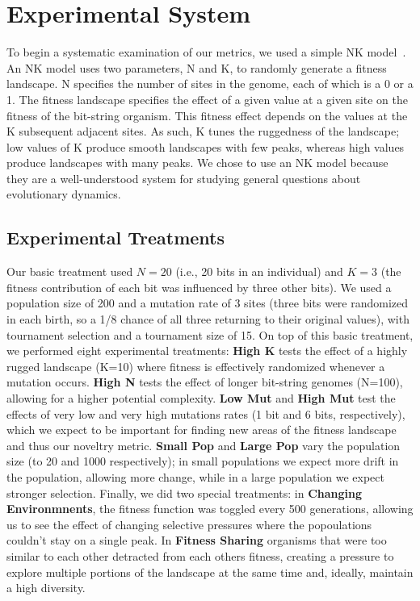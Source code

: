 \documentclass[letterpaper]{article}
\begin{document}
\section{Experimental System}
    To begin a systematic examination of our metrics, we used a simple NK model~\citep{kauffman_towards_1987}. An NK model uses two parameters, N and K, to randomly generate a fitness landscape. N specifies the number of sites in the genome, each of which is a 0 or a 1. The fitness landscape specifies the effect of a given value at a given site on the fitness of the bit-string organism. This fitness effect depends on the values at the K subsequent adjacent sites. As such, K tunes the ruggedness of the landscape; low values of K produce smooth landscapes with few peaks, whereas high values produce landscapes with many peaks. We chose to use an NK model because they are a well-understood system for studying general questions about evolutionary dynamics.

\subsection{Experimental Treatments}
	Our basic treatment used $N=20$ (i.e., 20 bits in an individual) and $K=3$ (the fitness contribution of each bit was influenced by three other bits).  We used a population size of 200 and a mutation rate of 3 sites (three bits were randomized in each birth, so a 1/8 chance of all three returning to their original values), with tournament selection and a tournament size of 15.  On top of this basic treatment, we performed eight experimental treatments: \textbf{High K} tests the effect of a highly rugged landscape (K=10) where fitness is effectively randomized whenever a mutation occurs.  \textbf{High N} tests the effect of longer bit-string genomes (N=100), allowing for a higher potential complexity.  \textbf{Low Mut} and \textbf{High Mut} test the effects of very low and very high mutations rates (1 bit and 6 bits, respectively), which we expect to be important for finding new areas of the fitness landscape and thus our noveltry metric.  \textbf{Small Pop} and \textbf{Large Pop} vary the population size (to 20 and 1000 respectively); in small populations we expect more drift in the population, allowing more change, while in a large population we expect stronger selection.  Finally, we did two special treatments: in \textbf{Changing Environmnents}, the fitness function was toggled every 500 generations, allowing us to see the effect of changing selective pressures where the popoulations couldn't stay on a single peak.  In \textbf{Fitness Sharing} organisms that were too similar to each other detracted from each others fitness, creating a pressure to explore multiple portions of the landscape at the same time and, ideally, maintain a high diversity.
\end{document}
